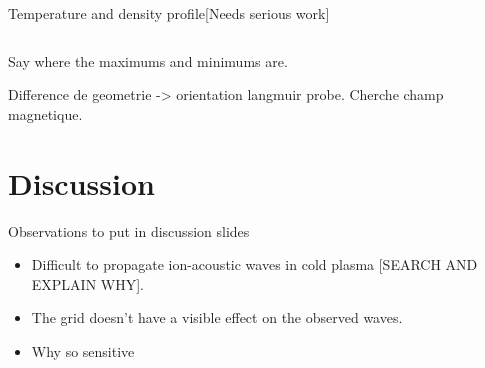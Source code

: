 \documentclass[10pt]{beamer}
\begin{document}
\begin{frame}{Temperature and density profile}{[Needs serious work]}
    \begin{columns}
        \centering

        \centering

    \end{columns}
    Say where the maximums and minimums are.

    Difference de geometrie -> orientation langmuir probe. Cherche champ magnetique.
    

\end{frame}


\section{Discussion}
\begin{frame}{Observations to put in discussion slides}
    \begin{itemize}
        \item Difficult to propagate ion-acoustic waves in cold plasma [SEARCH AND EXPLAIN WHY].
        \item The grid doesn't have a visible effect on the observed waves.
        \item Why so sensitive
    \end{itemize}
\end{frame}
\end{document}
